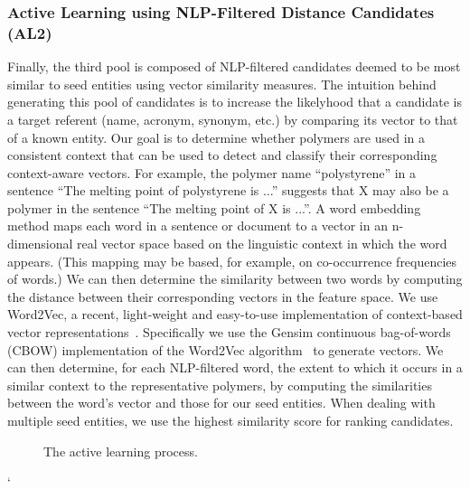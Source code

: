\subsubsection{Active Learning using NLP-Filtered Distance Candidates (AL2)}
Finally, the third pool is composed of NLP-filtered candidates deemed to be most similar to seed entities using vector similarity measures.
The intuition behind generating this pool of candidates is to increase the likelyhood that a candidate is a target referent (name, acronym, synonym, etc.) by comparing its vector to that of a known entity.
Our goal is to determine whether polymers are used in a consistent context that can be used to detect and classify their corresponding context-aware vectors.
For example, the polymer name ``polystyrene'' in a sentence ``The
melting point of polystyrene is ...'' suggests that X may also be a polymer in the
sentence ``The melting point of X is ...''.
A word embedding method maps each word
in a sentence or document to a vector in an n-dimensional real vector space
based on the linguistic context in which the word appears. (This mapping may
be based, for example, on co-occurrence frequencies of words.) 
We can then
determine the similarity between two words by computing the distance between
their corresponding vectors in the feature space.
We use Word2Vec, a recent, light-weight and easy-to-use implementation of context-based vector representations~\cite{mikolov2013efficient,mikolov2013distributed}.
Specifically we use the Gensim continuous bag-of-words
(CBOW) implementation of the Word2Vec
algorithm~\cite{rehurek2010software} to generate vectors.
We can then determine, for each NLP-filtered word, the extent to which it occurs
in a similar context to the representative polymers, by computing the similarities
between the word's vector and those for our seed entities. 
When dealing with multiple seed entities, we use the highest similarity score for ranking candidates.

\begin{figure}[!t]
\centering
{}
\caption{\label{fig:current} The active learning process.}
\end{figure}
`
